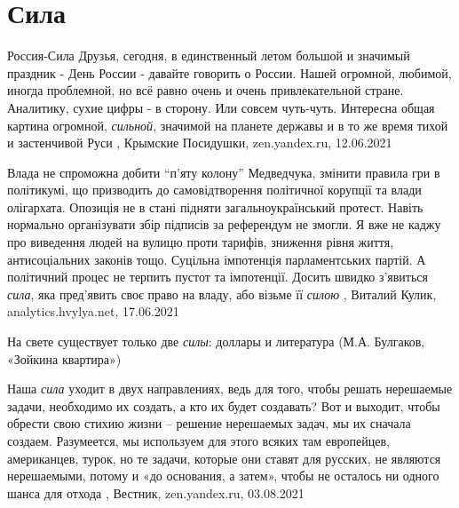  
 
 
 
 
\chapter{Сила}
\label{sec:slova.sila}

Россия-Сила
Друзья, сегодня, в единственный летом большой и значимый праздник - День России
- давайте говорить о России. Нашей огромной, любимой, иногда проблемной, но всё
равно очень и очень привлекательной стране.  Аналитику, сухие цифры - в
сторону. Или совсем чуть-чуть. Интересна общая картина огромной,
\emph{сильной}, значимой на планете державы и в то же время тихой и застенчивой
Руси
, 
Крымские Посидушки, zen.yandex.ru, 12.06.2021

Влада не спроможна добити \enquote{п'яту колону} Медведчука, змінити правила гри в
політикумі, що призводить до самовідтворення політичної корупції та влади
олігархата. Опозиція не в стані підняти загальноукраїнський протест. Навіть
нормально організувати збір підписів за референдум не змогли. Я вже не каджу
про виведення людей на вулицю проти тарифів, зниження рівня життя,
антисоціальних законів тощо. Суцільна імпотенція парламентських партій.  А
політичний процес не терпить пустот та імпотенції. Досить швидко з'явиться
\emph{сила}, яка пред'явить своє право на владу, або візьме її \emph{силою}
, 
Виталий Кулик, analytics.hvylya.net, 17.06.2021

На свете существует только две \emph{силы}: доллары и литература (М.А. Булгаков, «Зойкина квартира»)


Наша \emph{сила} уходит в двух направлениях, ведь для того, чтобы решать нерешаемые
задачи, необходимо их создать, а кто их будет создавать? Вот и выходит, чтобы
обрести свою стихию жизни – решение нерешаемых задач, мы их сначала создаем.
Разумеется, мы используем для этого всяких там европейцев, американцев, турок,
но те задачи, которые они ставят для русских, не являются нерешаемыми, потому и
«до основания, а затем», чтобы не осталось ни одного шанса для отхода
, Вестник, zen.yandex.ru, 03.08.2021
